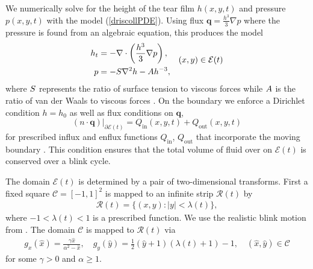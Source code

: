 We numerically solve for the height of the tear film $h(x,y,t)$ and pressure $p(x,y,t)$ with the model (\ref{driscollPDE}). Using flux $\bm{q} =  \frac{h^3}{3} \nabla p$ where the pressure is found from an algebraic equation, this produces the model
\begin{align}
\begin{aligned}
h_t &= - \nabla \cdot \left( \frac{h^3}{3} \nabla p \right), \\
p &= - S \nabla^2 h - A h^{-3},
\end{aligned} \quad (x,y) \in \mathcal{E}(t)
\label{the_pde}
\end{align}
where $S$ represents the ratio of surface tension to viscous forces while $A$ is the ratio of van der Waals to viscous forces \cite{braun2015dynamics}. On the boundary we enforce a Dirichlet condition $h=h_0$ as well as flux conditions on $\bm{q}$,
\begin{equation}
\label{normal_conds}
(n \cdot \bm{q})\vert_{\partial \mathcal{E}(t)} = Q_{\text{in}}(x,y,t)+Q_{\text{out}}(x,y,t)
\end{equation}
for prescribed influx and enflux functions $Q_{\text{in}}$, $Q_{\text{out}}$ that incorporate the moving boundary  \cite{li2015computed,heryudono2007single,braun2015dynamics}.
This condition ensures that the total volume of fluid over on $\mathcal{E}(t)$ is conserved over a blink cycle.


The domain $\mathcal{E}(t)$ is determined by a pair of two-dimensional transforms. First a fixed square $\mathcal{C}=[-1,1]^2$ is mapped to an infinite strip $\mathcal{R}(t)$ by
\begin{align}
\mathcal{R}(t) = \{(x,y):|y|<\lambda(t)\},
\end{align}
where $-1<\lambda(t)<1$ is a prescribed function. We use the realistic blink motion from \cite{deng2014heat}. The domain $\mathcal{C}$ is mapped to $\mathcal{R}(t)$ via
\begin{align}
	g_x(\hat{x}) = \frac{\gamma \hat{x}}{\alpha^2 - \hat{x}}, \quad g_y(\hat{y}) = \frac{1}{2} (\hat{y}+1)(\lambda(t)+1)-1, \quad (\hat{x},\hat{y}) \in \mathcal{C}
\end{align}
for some $\gamma>0$ and $\alpha \geq 1$.


